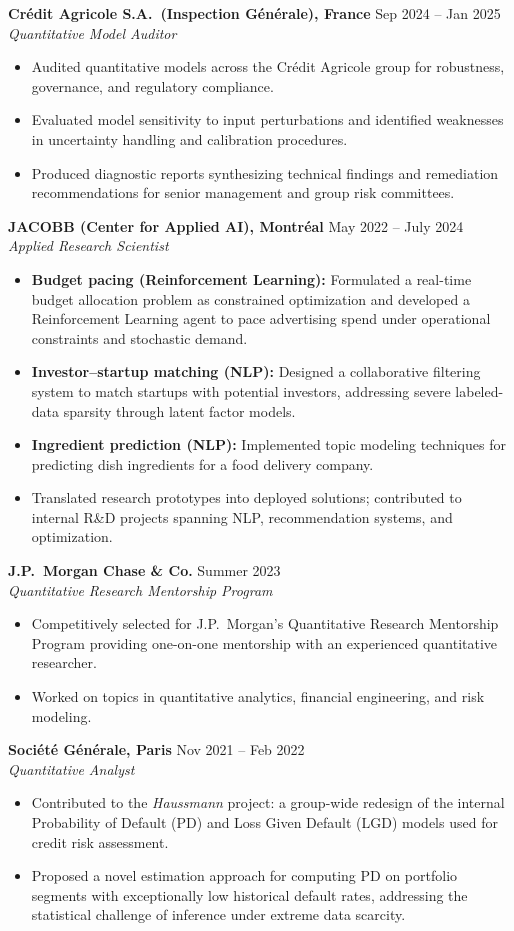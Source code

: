 \documentclass[10pt, a4paper]{article}
\newcommand{\entry}[4]{
    \vspace{0.15em}
    \noindent \textbf{#1} \hfill #2 \\
    {\small \textit{#3}}
    \begin{itemize}[leftmargin=1.2em, nosep, label=\tiny$\bullet$, itemsep=1pt]
        #4
    \end{itemize}
}
\begin{document}
\entry{Cr\'edit Agricole S.A.\ (Inspection G\'en\'erale), France}{Sep 2024 -- Jan 2025}
{Quantitative Model Auditor}
{
    \item Audited quantitative models across the Cr\'edit Agricole group for robustness, governance, and regulatory compliance.
    \item Evaluated model sensitivity to input perturbations and identified weaknesses in uncertainty handling and calibration procedures.
    \item Produced diagnostic reports synthesizing technical findings and remediation recommendations for senior management and group risk committees.
}

\entry{JACOBB (Center for Applied AI), Montr\'eal}{May 2022 -- July 2024}
{Applied Research Scientist \normalfont{(Supervisors: P.\ Rosin, Dr.\ M.\ Cot\'e)}}
{
    \item \textbf{Budget pacing (Reinforcement Learning):} Formulated a real-time budget allocation problem as constrained optimization and developed a Reinforcement Learning agent to pace advertising spend under operational constraints and stochastic demand.
    \item \textbf{Investor--startup matching (NLP):} Designed a collaborative filtering system to match startups with potential investors, addressing severe labeled-data sparsity through latent factor models.
    \item \textbf{Ingredient prediction (NLP):} Implemented topic modeling techniques for predicting dish ingredients for a food delivery company.
    \item Translated research prototypes into deployed solutions; contributed to internal R\&D projects spanning NLP, recommendation systems, and optimization.
}

\entry{J.P.\ Morgan Chase \& Co.}{Summer 2023}
{Quantitative Research Mentorship Program}
{
    \item Competitively selected for J.P.\ Morgan's Quantitative Research Mentorship Program providing one-on-one mentorship with an experienced quantitative researcher.
    \item Worked on topics in quantitative analytics, financial engineering, and risk modeling.
}

\entry{Soci\'et\'e G\'en\'erale, Paris}{Nov 2021 -- Feb 2022}
{Quantitative Analyst}
{
    \item Contributed to the \textit{Haussmann} project: a group-wide redesign of the internal Probability of Default (PD) and Loss Given Default (LGD) models used for credit risk assessment.
    \item Proposed a novel estimation approach for computing PD on portfolio segments with exceptionally low historical default rates, addressing the statistical challenge of inference under extreme data scarcity.
}
\end{document}
